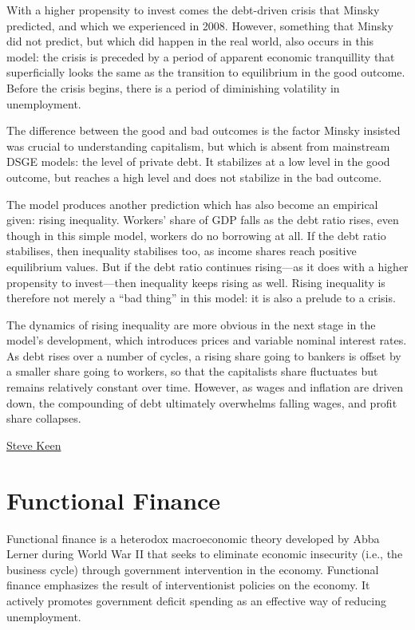 \documentclass[
]{book}
\begin{document}
With a higher propensity to invest comes the debt-driven crisis that Minsky predicted, and which we experienced in 2008. However, something that Minsky did not predict, but which did happen in the real world, also occurs in this model: the crisis is preceded by a period of apparent economic tranquillity that superficially looks the same as the transition to equilibrium in the good outcome. Before the crisis begins, there is a period of diminishing volatility in unemployment.

The difference between the good and bad outcomes is the factor Minsky insisted was crucial to understanding capitalism, but which is absent from mainstream DSGE models: the level of private debt. It stabilizes at a low level in the good outcome, but reaches a high level and does not stabilize in the bad outcome.

The model produces another prediction which has also become an empirical given: rising inequality. Workers' share of GDP falls as the debt ratio rises, even though in this simple model, workers do no borrowing at all. If the debt ratio stabilises, then inequality stabilises too, as income shares reach positive equilibrium values. But if the debt ratio continues rising---as it does with a higher propensity to invest---then inequality keeps rising as well. Rising inequality is therefore not merely a ``bad thing'' in this model: it is also a prelude to a crisis.

The dynamics of rising inequality are more obvious in the next stage in the model's development, which introduces prices and variable nominal interest rates. As debt rises over a number of cycles, a rising share going to bankers is offset by a smaller share going to workers, so that the capitalists share fluctuates but remains relatively constant over time. However, as wages and inflation are driven down, the compounding of debt ultimately overwhelms falling wages, and profit share collapses.

\href{https://evonomics.com/why-economists-have-to-embrace-complexity-steve-keen/}{Steve Keen}

\hypertarget{functional-finance}{%
\chapter{Functional Finance}\label{functional-finance}}

Functional finance is a heterodox macroeconomic theory developed by Abba Lerner during World War II that seeks to eliminate economic insecurity (i.e., the business cycle) through government intervention in the economy. Functional finance emphasizes the result of interventionist policies on the economy. It actively promotes government deficit spending as an effective way of reducing unemployment.
\end{document}
